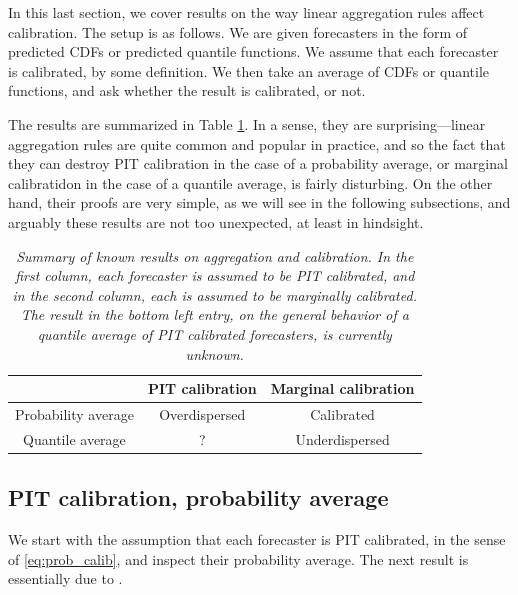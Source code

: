 \documentclass{article}
\begin{document}
In this last section, we cover results on the way linear aggregation rules
affect calibration. The setup is as follows. We are given forecasters in the
form of predicted CDFs or predicted quantile functions. We assume that each
forecaster is calibrated, by some definition. We then take an average of CDFs or
quantile functions, and ask whether the result is calibrated, or not.

The results are summarized in Table \ref{tab:aggr_calib}. In a sense, they are
surprising---linear aggregation rules are quite common and popular in practice,
and so the fact that they can destroy PIT calibration in the case of a probability 
average, or marginal calibratidon in the case of a quantile average, is fairly
disturbing. On the other hand, their proofs are very simple, as we will see in
the following subsections, and arguably these results are not too unexpected, at
least in hindsight. 

\begin{table}[htb]
\centering
\begin{tabular}{c|c|c}
& PIT calibration & Marginal calibration \\
\hline
Probability average & Overdispersed & Calibrated \\
\hline
Quantile average & ? & Underdispersed 
\end{tabular}
\caption{\it Summary of known results on aggregation and calibration. In the
  first column, each forecaster is assumed to be PIT calibrated, and in the
  second column, each is assumed to be marginally calibrated. The result in the
  bottom left entry, on the general behavior of a quantile average of PIT
  calibrated forecasters, is currently unknown.} 
\label{tab:aggr_calib}
\end{table}

\subsection{PIT calibration, probability average}

We start with the assumption that each forecaster is PIT calibrated, in the
sense of \eqref{eq:prob_calib}, and inspect their probability average. The next
result is essentially due to \citet{ranjan2010combining}.  
\end{document}
